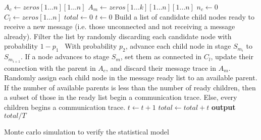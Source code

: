 \documentclass[12pt]{article}
\begin{document}
\begin{algorithm}[H] \label{alg:simulation}
  \SetAlgoLined
  	$A_c \gets zeros[1\dots n][1\dots n]$\;
    $A_m \gets zeros[1\dots k][1\dots n][1\dots n]$\;
    $n_c \gets 0$\;
    $C_l \gets zeros[1\dots n]$\;
    $total \gets 0$\;
	 {
    	$t \gets 0$\;
    	 {
        	Build a list of candidate child nodes ready to receive a new message (i.e. those unconnected and not receiving a message already). Filter the list by randomly discarding each candidate node with probability $1 - p_1$\
             {
            	With probability $p_2$, advance each child node in stage $S_{m_i}$ to $S_{m_{i+1}}$. If a node advances to stage $S_m$, set them as connected in $C_l$, update their connection with the parent in $A_c$, and discard their message trace in $A_m$.\;
        	}
            Randomly assign each child node in the message ready list to an available parent. If the number of available parents is less than the number of ready children, then a subset of those in the ready list begin a communication trace. Else, every children begins a communication trace.\;
            $t \gets t + 1$\;
        }
        $total \gets total + t$\;
    }
    \textbf{output} $total / T$
  \caption{Monte carlo simulation to verify the statistical model}
\end{algorithm}
\end{document}
